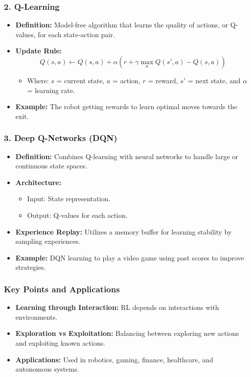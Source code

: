 \documentclass[aspectratio=169]{beamer}
\begin{document}
\begin{frame}[fragile]
    \frametitle{2. Q-Learning}
    \begin{itemize}
        \item \textbf{Definition:} Model-free algorithm that learns the quality of actions, or Q-values, for each state-action pair.
        \item \textbf{Update Rule:}
        \begin{equation}
            Q(s, a) \leftarrow Q(s, a) + \alpha \left( r + \gamma \max_a Q(s', a) - Q(s, a) \right)
        \end{equation}
        \begin{itemize}
            \item Where: $s$ = current state, $a$ = action, $r$ = reward, $s'$ = next state, and $\alpha$ = learning rate.
        \end{itemize}
        \item \textbf{Example:} The robot getting rewards to learn optimal moves towards the exit.
    \end{itemize}
\end{frame}

\begin{frame}[fragile]
    \frametitle{3. Deep Q-Networks (DQN)}
    \begin{itemize}
        \item \textbf{Definition:} Combines Q-learning with neural networks to handle large or continuous state spaces.
        \item \textbf{Architecture:} 
        \begin{itemize}
            \item Input: State representation.
            \item Output: Q-values for each action.
        \end{itemize}
        \item \textbf{Experience Replay:} Utilizes a memory buffer for learning stability by sampling experiences.
        \item \textbf{Example:} DQN learning to play a video game using past scores to improve strategies.
    \end{itemize}
\end{frame}

\begin{frame}[fragile]
    \frametitle{Key Points and Applications}
    \begin{itemize}
        \item \textbf{Learning through Interaction:} RL depends on interactions with environments.
        \item \textbf{Exploration vs Exploitation:} Balancing between exploring new actions and exploiting known actions.
        \item \textbf{Applications:} Used in robotics, gaming, finance, healthcare, and autonomous systems.
    \end{itemize}
\end{frame}
\end{document}
